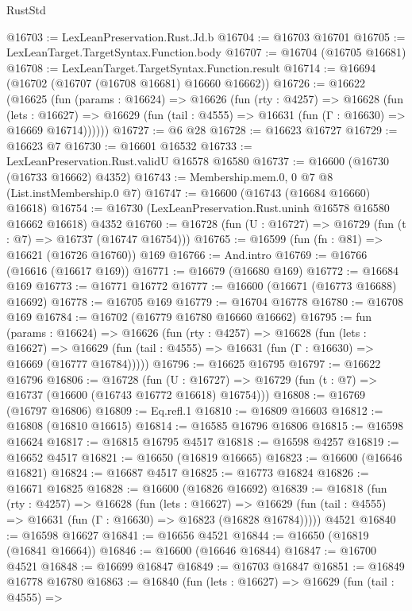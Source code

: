 \begin{lexlean}{RustStd}
\begin{coremodule}
{\begin{coremodule}
{{{{{{{{{{{{{{{{{{{{{{{{{{{{{{{{{{{{{{{{{{{{{{{{{{{{{{{@16703 := LexLeanPreservation.Rust.Jd.b
@16704 := @16703 @16701
@16705 := LexLeanTarget.TargetSyntax.Function.body
@16707 := @16704 (@16705 @16681)
@16708 := LexLeanTarget.TargetSyntax.Function.result
@16714 := @16694 (@16702 (@16707 (@16708 @16681) @16660 @16662))
@16726 := @16622
    (@16625
      (fun (params : @16624) =>
      @16626
        (fun (rty : @4257) =>
        @16628
          (fun (lets : @16627) =>
          @16629 (fun (tail : @4555) => @16631 (fun (Γ : @16630) => @16669 @16714))))))
@16727 := @6 @28
@16728 := @16623 @16727
@16729 := @16623 @7
@16730 := @16601 @16532
@16733 := LexLeanPreservation.Rust.validU @16578 @16580
@16737 := @16600 (@16730 (@16733 @16662) @4352)
@16743 := Membership.mem.{0, 0} @7 @8 (List.instMembership.{0} @7)
@16747 := @16600 (@16743 (@16684 @16660) @16618)
@16754 := @16730 (LexLeanPreservation.Rust.uninh @16578 @16580 @16662 @16618) @4352
@16760 := @16728 (fun (U : @16727) => @16729 (fun (t : @7) => @16737 (@16747 @16754)))
@16765 := @16599 (fun (fn : @81) => @16621 (@16726 @16760)) @169
@16766 := And.intro
@16769 := @16766 (@16616 (@16617 @169))
@16771 := @16679 (@16680 @169)
@16772 := @16684 @169
@16773 := @16771 @16772
@16777 := @16600 (@16671 (@16773 @16688) @16692)
@16778 := @16705 @169
@16779 := @16704 @16778
@16780 := @16708 @169
@16784 := @16702 (@16779 @16780 @16660 @16662)
@16795 := fun (params : @16624) =>
  @16626
    (fun (rty : @4257) =>
    @16628
      (fun (lets : @16627) =>
      @16629 (fun (tail : @4555) => @16631 (fun (Γ : @16630) => @16669 (@16777 @16784)))))
@16796 := @16625 @16795
@16797 := @16622 @16796
@16806 := @16728
    (fun (U : @16727) => @16729 (fun (t : @7) => @16737 (@16600 (@16743 @16772 @16618) @16754)))
@16808 := @16769 (@16797 @16806)
@16809 := Eq.refl.{1}
@16810 := @16809 @16603
@16812 := @16808 (@16810 @16615)
@16814 := @16585 @16796 @16806
@16815 := @16598 @16624
@16817 := @16815 @16795 @4517
@16818 := @16598 @4257
@16819 := @16652 @4517
@16821 := @16650 (@16819 @16665)
@16823 := @16600 (@16646 @16821)
@16824 := @16687 @4517
@16825 := @16773 @16824
@16826 := @16671 @16825
@16828 := @16600 (@16826 @16692)
@16839 := @16818
    (fun (rty : @4257) =>
    @16628
      (fun (lets : @16627) =>
      @16629 (fun (tail : @4555) => @16631 (fun (Γ : @16630) => @16823 (@16828 @16784)))))
    @4521
@16840 := @16598 @16627
@16841 := @16656 @4521
@16844 := @16650 (@16819 (@16841 @16664))
@16846 := @16600 (@16646 @16844)
@16847 := @16700 @4521
@16848 := @16699 @16847
@16849 := @16703 @16847
@16851 := @16849 @16778 @16780
@16863 := @16840
    (fun (lets : @16627) =>
    @16629
      (fun (tail : @4555) =>
}}}}}}}}}}}}}}}}}}}}}}}}}}}}}}}}}}}}}}}}}}}}}}}}}}}}}}}
\end{coremodule}}
\end{coremodule}
\end{lexlean}
